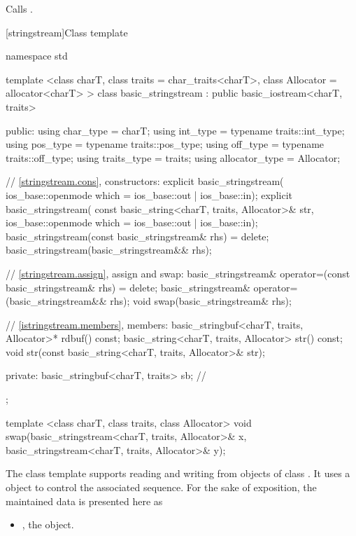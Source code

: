 \begin{itemdescr}
\pnum
\effects
Calls
.
\end{itemdescr}

[stringstream]{Class template }

%
\begin{codeblock}
namespace std {
  template <class charT, class traits = char_traits<charT>,
            class Allocator = allocator<charT> >
  class basic_stringstream
    : public basic_iostream<charT, traits> {
  public:
    using char_type      = charT;
    using int_type       = typename traits::int_type;
    using pos_type       = typename traits::pos_type;
    using off_type       = typename traits::off_type;
    using traits_type    = traits;
    using allocator_type = Allocator;

    // \ref{stringstream.cons}, constructors:
    explicit basic_stringstream(
      ios_base::openmode which = ios_base::out | ios_base::in);
    explicit basic_stringstream(
      const basic_string<charT, traits, Allocator>& str,
      ios_base::openmode which = ios_base::out | ios_base::in);
    basic_stringstream(const basic_stringstream& rhs) = delete;
    basic_stringstream(basic_stringstream&& rhs);

    // \ref{stringstream.assign}, assign and swap:
    basic_stringstream& operator=(const basic_stringstream& rhs) = delete;
    basic_stringstream& operator=(basic_stringstream&& rhs);
    void swap(basic_stringstream& rhs);

    // \ref{istringstream.members}, members:
    basic_stringbuf<charT, traits, Allocator>* rdbuf() const;
    basic_string<charT, traits, Allocator> str() const;
    void str(const basic_string<charT, traits, Allocator>& str);

  private:
    basic_stringbuf<charT, traits> sb;  // \expos
  };

  template <class charT, class traits, class Allocator>
    void swap(basic_stringstream<charT, traits, Allocator>& x,
              basic_stringstream<charT, traits, Allocator>& y);
}
\end{codeblock}

\pnum
The
class template
supports reading and writing from objects of class
.
It uses a
object to control the associated sequence.
For the sake of exposition, the maintained data is presented here as
\begin{itemize}
\item
{}, the  object.
\end{itemize}

